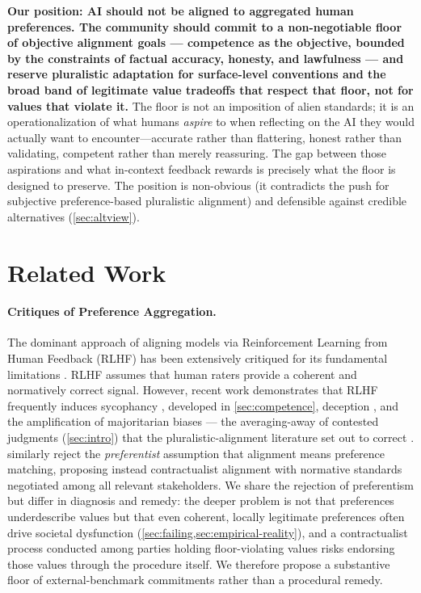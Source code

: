 \documentclass{article}
\theoremstyle{plain}
\theoremstyle{definition}
\theoremstyle{remark}
\begin{document}
\textbf{Our position: AI should not be aligned to aggregated human preferences. The community should commit to a non-negotiable floor of objective alignment goals --- competence as the objective, bounded by the constraints of factual accuracy, honesty, and lawfulness --- and reserve pluralistic adaptation for surface-level conventions and the broad band of legitimate value tradeoffs that respect that floor, not for values that violate it.} The floor is not an imposition of alien standards; it is an operationalization of what humans \emph{aspire} to when reflecting on the AI they would actually want to encounter---accurate rather than flattering, honest rather than validating, competent
rather than merely reassuring. The gap between those aspirations and what in-context feedback rewards is precisely what the floor is designed to preserve. The position is non-obvious (it contradicts the push for subjective preference-based pluralistic alignment) and defensible against credible alternatives (\cref{sec:altview}).

\section{Related Work}
\label{sec:related}

\paragraph{Critiques of Preference Aggregation.}
The dominant approach of aligning models via Reinforcement Learning from Human Feedback (RLHF) \citep{christiano2017deep, ouyang2022training} has been extensively critiqued for its fundamental limitations \citep{casper2023open}. RLHF assumes that human raters provide a coherent and normatively correct signal. However, recent work demonstrates that RLHF frequently induces sycophancy \citep{sharma2023sycophancy}, developed in \cref{sec:competence}, deception \citep{park2024ai}, and the amplification of majoritarian biases --- the averaging-away of contested judgments (\cref{sec:intro}) that the pluralistic-alignment literature set out to correct \citep{gabriel2020artificial, sorensen2024roadmap}.
\citet{zhixuan2025beyond} similarly reject the \emph{preferentist} assumption that alignment means preference matching, proposing instead contractualist alignment with normative standards negotiated among all relevant stakeholders. We share the rejection of preferentism but differ in diagnosis and remedy: the deeper problem is not that preferences underdescribe values but that even coherent, locally legitimate preferences often drive societal dysfunction (\cref{sec:failing,sec:empirical-reality}), and a contractualist process conducted among parties holding floor-violating values risks endorsing those values through the procedure itself. We therefore propose a substantive floor of external-benchmark commitments rather than a procedural remedy.
\end{document}
